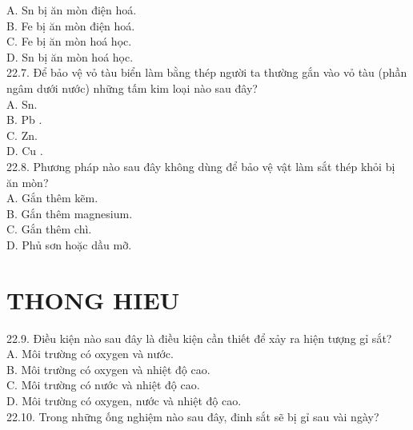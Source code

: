 \documentclass[10pt]{article}
\begin{document}
A. Sn bị ăn mòn điện hoá.\\
B. Fe bị ăn mòn điện hoá.\\
C. Fe bị ăn mòn hoá học.\\
D. Sn bị ăn mòn hoá học.\\
22.7. Để bảo vệ vỏ tàu biển làm bằng thép người ta thường gắn vào vỏ tàu (phần ngâm dưới nước) những tấm kim loại nào sau đây?\\
A. Sn.\\
B. Pb .\\
C. Zn.\\
D. Cu .\\
22.8. Phương pháp nào sau đây không dùng để bảo vệ vật làm sắt thép khỏi bị ăn mòn?\\
A. Gắn thêm kẽm.\\
B. Gắn thêm magnesium.\\
C. Gắn thêm chì.\\
D. Phủ sơn hoặc dầu mỡ.

\section*{THONG HIEU}
22.9. Điều kiện nào sau đây là điều kiện cần thiết để xảy ra hiện tượng gỉ sắt?\\
A. Môi trường có oxygen và nước.\\
B. Môi trường có oxygen và nhiệt độ cao.\\
C. Môi trường có nước và nhiệt độ cao.\\
D. Môi trường có oxygen, nước và nhiệt độ cao.\\
22.10. Trong những ống nghiệm nào sau đây, đinh sắt sẽ bị gỉ sau vài ngày?
\end{document}

